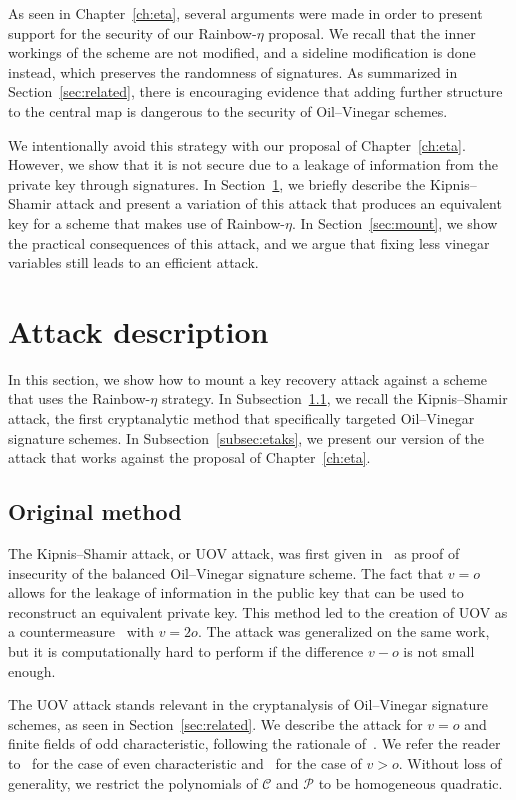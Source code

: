 \documentclass[english]{ufsc-thesis-rn46-2019/ufsc-thesis-rn46-2019}
\theoremstyle{definition}
\begin{document}
As seen in Chapter~\ref{ch:eta}, several arguments were made in order to
present support for the security of our Rainbow-$\eta$ proposal. We recall that
the inner workings of the scheme are not modified, and a sideline modification
is done instead, which preserves the randomness of signatures. As summarized in
Section~\ref{sec:related}, there is encouraging evidence that adding further
structure to the central map is dangerous to the security of Oil--Vinegar
schemes.

We intentionally avoid this strategy with our proposal of
Chapter~\ref{ch:eta}. However, we show that it is not secure due to a leakage
of information from the private key through signatures. In
Section~\ref{sec:atdesc}, we briefly describe the Kipnis--Shamir attack and
present a variation of this attack that produces an equivalent key for a scheme
that makes use of Rainbow-$\eta$. In Section~\ref{sec:mount}, we show the
practical consequences of this attack, and we argue that fixing less vinegar
variables still leads to an efficient attack.

\section{Attack description}\label{sec:atdesc}

In this section, we show how to mount a key recovery attack against a scheme
that uses the Rainbow-$\eta$ strategy. In Subsection~\ref{subsec:ks}, we recall
the Kipnis--Shamir attack, the first cryptanalytic method that specifically
targeted Oil--Vinegar signature schemes. In Subsection~\ref{subsec:etaks}, we
present our version of the attack that works against the proposal of
Chapter~\ref{ch:eta}.

\subsection{Original method}\label{subsec:ks}

The Kipnis--Shamir attack, or UOV attack, was first given
in~\cite{Kipnis:199808} as proof of insecurity of the balanced Oil--Vinegar
signature scheme. The fact that $v = o$ allows for the leakage of information
in the public key that can be used to reconstruct an equivalent private
key. This method led to the creation of UOV as
a countermeasure~\cite{Kipnis:199904} with $v = 2o$. The attack was generalized
on the same work, but it is computationally hard to perform if the difference
$v - o$ is not small enough.

The UOV attack stands relevant in the cryptanalysis of Oil--Vinegar signature
schemes, as seen in Section~\ref{sec:related}. We describe the attack for
$v = o$ and finite fields of odd characteristic, following the rationale
of~\cite[Sec.~3.2]{Ding:2006}. We refer the reader to~\cite{Cao:201105} for the
case of even characteristic and~\cite{Kipnis:199904} for the case of
$v > o$. Without loss of generality, we restrict the polynomials of
$\mathcal{C}$ and $\mathcal{P}$ to be homogeneous quadratic.
\end{document}
